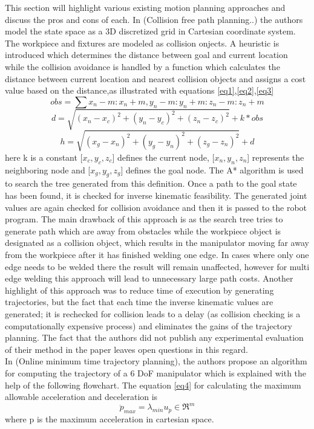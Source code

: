 This section will highlight various existing motion planning approaches and discuss the pros and cons of each. In \cite{2}(Collision free path planning..) the authors model the state space as a 3D discretized grid in Cartesian coordinate system. The workpiece and fixtures are modeled as collision onjects. A heuristic is introduced which determines the distance between goal and current location while the collision avoidance is handled by a function which calculates the distance between current location and nearest collision objects and assigns a cost value based on the distance,as illustrated with equations \eqref{eq1},\eqref{eq2},\eqref{eq3}
\begin{equation}
\label{eq1}
obs = \sum x_{n} - m:x_{n} + m,y_{n} - m:y_{n} + m:z_{n} - m:z_{n} + m
\end{equation}
\begin{equation}
\label{eq2}
d = \sqrt{(x_{n} - x_{c})^2 + (y_{n} - y_{c})^2 + (z_{n} - z_{c})^2} + k*obs
\end{equation}
\begin{equation}
\label{eq3}
h = \sqrt{(x_{g} - x_{n})^2 + (y_{g} - y_{n})^2 + (z_{g} - z_{n})^2} + d
\end{equation}
here k is a constant [$x_{c},y_{c},z_{c}$] defines the current node, [$x_{n},y_{n},z_{n}$] represents the neighboring node and [$x_{g},y_{g},z_{g}$] defines the goal node. The A* algorithm is used to search the tree generated from this definition. Once a path to the goal state has been found, it is checked for inverse kinematic feasibility. The generated joint values are again checked for collision avoidance and then it is passed to the robot program. The main drawback of this approach is as the search tree tries to generate path which are away from obstacles while the workpiece object is designated as a collision object, which results in the manipulator moving far away from the workpiece after it has finished welding one edge. In cases where only one edge needs to be welded there the result will remain unaffected, however for multi edge welding this approach will lead to unnecessary large path costs. Another highlight of this approach was to reduce time of execution by generating trajectories, but the fact that each time the inverse kinematic values are generated; it is rechecked for collision leads to a delay (as collision checking is a computationally expensive process) and eliminates the gains of the trajectory planning. The fact that the authors did not publish any experimental evaluation of their method in the paper leaves open questions in this regard. \\
In \cite{3}(Online minimum time trajectory planning), the authors propose an algorithm for computing the trajectory of a 6 DoF manipulator which is explained with the help of the following flowchart. The equation \eqref{eq4} for calculating the maximum allowable acceleration and deceleration is 
\begin{equation}
\label{eq4}
\ddot{p}_{max} = \lambda_{min}u_{\ddot{p}}\in \Re^{m}
\end{equation}
where p is the maximum acceleration in cartesian space.

